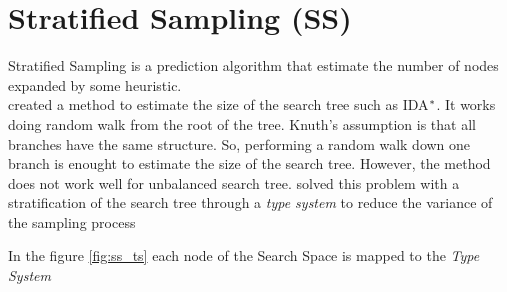 \section{Stratified Sampling (SS)}
Stratified Sampling is a prediction algorithm that estimate the number of nodes expanded by some heuristic.\\

\cite{knuth1975Estimating} created a method to estimate the size of the search tree such as IDA$\sp{*}$. It works doing random walk from the root of the tree. Knuth's assumption is that all branches have the same structure. So, performing a random walk down one branch is enought to estimate the size of the search tree. However, the method does not work well for unbalanced search tree. \cite{chen1992heuristic}
 solved this problem with a stratification of the search tree through a \textit{type system} to reduce the variance of the sampling process\cite{lelis2013predicting}

In the figure \ref{fig:ss_ts} each node of the Search Space is mapped to the \textit{Type System}

